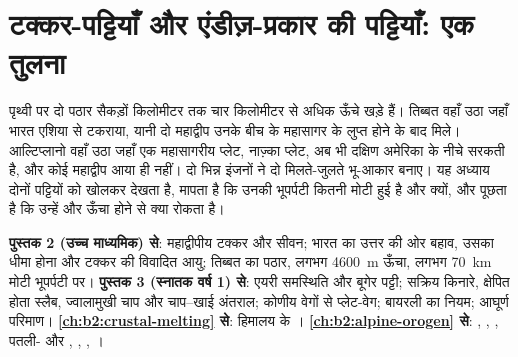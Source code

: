 \chapter{टक्कर-पट्टियाँ और एंडीज़-प्रकार की पट्टियाँ: एक तुलना}\label{ch:b2:himalaya-andes}

पृथ्वी पर दो पठार सैकड़ों किलोमीटर तक चार किलोमीटर से अधिक ऊँचे खड़े हैं।
तिब्बत वहाँ उठा जहाँ भारत एशिया से टकराया, यानी दो महाद्वीप उनके बीच के महासागर के लुप्त होने के बाद
मिले। आल्टिप्लानो वहाँ उठा जहाँ एक महासागरीय प्लेट, नाज़्का प्लेट, अब भी दक्षिण अमेरिका के
नीचे सरकती है, और कोई महाद्वीप आया ही नहीं। दो भिन्न इंजनों ने दो
मिलते-जुलते भू-आकार बनाए। यह अध्याय दोनों पट्टियों को खोलकर देखता है, मापता है कि उनकी भूपर्पटी कितनी मोटी
हुई है और क्यों, और पूछता है कि उन्हें और ऊँचा होने से क्या रोकता है।

\begin{recall}
\textbf{पुस्तक 2 (उच्च माध्यमिक) से}: महाद्वीपीय टक्कर और सीवन; भारत का
उत्तर की ओर बहाव, उसका धीमा होना और टक्कर की विवादित आयु; तिब्बत का पठार, लगभग
\qty{4600}{m} ऊँचा, लगभग \qty{70}{km} मोटी भूपर्पटी पर। \textbf{पुस्तक 3 (स्नातक वर्ष 1) से}:
एयरी समस्थिति और बूगेर पट्टी; सक्रिय किनारे, क्षेपित होता स्लैब, ज्वालामुखी चाप और
चाप--खाई अंतराल; कोणीय वेगों से प्लेट-वेग; बायरली का नियम; आघूर्ण
परिमाण। \textbf{\cref{ch:b2:crustal-melting} से}: हिमालय के ।
\textbf{\cref{ch:b2:alpine-orogen} से}: , , , पतली- और
, , , ।
\end{recall}

